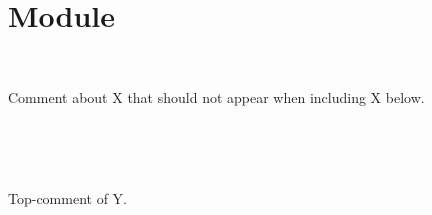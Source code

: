 \section{Module }\label{module-Include2}%
\label{module-Include2-module-X}\begin{ocamlindent}\label{module-Include2-module-X-type-t}\\
\end{ocamlindent}%
\begin{ocamlindent}Comment about X that should not appear when including X below.\end{ocamlindent}%
\medbreak
{}      \hyperref[module-Include2-module-X]{} \label{module-Include2-type-t}\\
\label{module-Include2-module-Y}\begin{ocamlindent}\label{module-Include2-module-Y-type-t}\\
\end{ocamlindent}%
\begin{ocamlindent}Top-comment of Y.\end{ocamlindent}%
\medbreak
\label{module-Include2-module-Y_include_synopsis}\begin{ocamlindent}      \hyperref[module-Include2-module-Y]{} \label{module-Include2-module-Y_include_synopsis-type-t}\\
\end{ocamlindent}%
